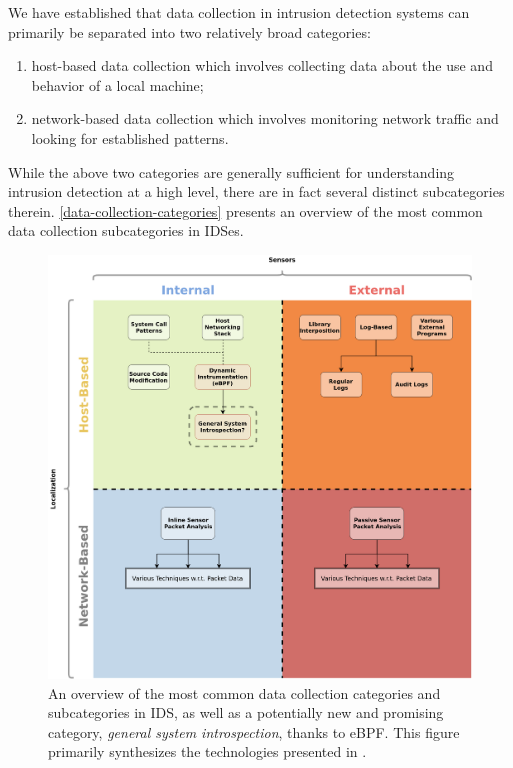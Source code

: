 \documentclass[
  12pt]{findlay}
\providecommand{\tightlist}{\setlength{\itemsep}{0pt}\setlength{\parskip}{0pt}}
\begin{document}
We have established that data collection in intrusion detection systems
can primarily be separated into two relatively broad categories:

\begin{enumerate}
\def\labelenumi{\arabic{enumi})}
\tightlist
\item
  host-based data collection which involves collecting data about the
  use and behavior of a local machine;
\item
  network-based data collection which involves monitoring network
  traffic and looking for established patterns.
\end{enumerate}

While the above two categories are generally sufficient for
understanding intrusion detection at a high level, there are in fact
several distinct subcategories therein.
\autoref{data-collection-categories} presents an overview of the most
common data collection subcategories in IDSes.

\begin{figure}[p]
    \caption[An overview of the most common data collection categories and subcategories in IDS]{
        An overview of the most common data collection categories and subcategories in IDS,
        as well as a potentially new and promising category, {\itshape general system introspection}, thanks to eBPF.
        This figure primarily synthesizes the technologies presented in \cite{spafford02, stallings07}.
    }
    \label{data-collection-categories}
    \includegraphics{../figures/data-collection-categories.png}
\end{figure}
\end{document}
